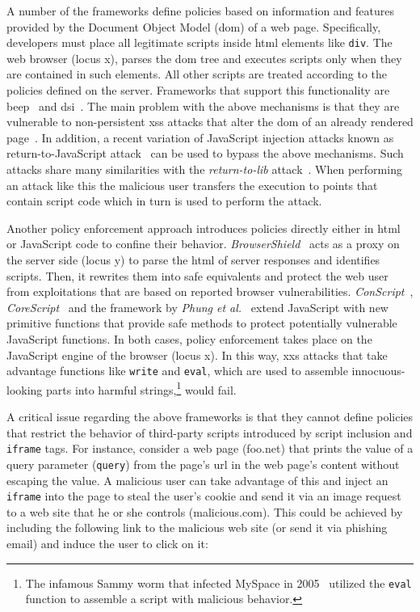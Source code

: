 \documentclass[conference]{IEEEtran}
\begin{document}
A number of the frameworks define policies
based on information and features provided by
the Document Object Model ({\sc dom}) of a web page.
Specifically, developers must place all legitimate
scripts inside {\sc html} elements like {\tt div}.
The web browser (locus {\sc x}), parses the
{\sc dom} tree and executes scripts only when they
are contained in such elements. All other scripts
are treated according to the policies defined
on the server. Frameworks that support this
functionality are {\sc beep}~\cite{TNH07}
and {\sc dsi}~\cite{NSS06}. The main problem with
the above mechanisms is that they are vulnerable
to non-persistent {\sc xss} attacks that alter
the {\sc dom} of an already rendered
page~\cite{APKLM10}.
In addition, a recent variation of JavaScript
injection attacks known as return-to-JavaScript
attack~\cite{APKLM10} can be used to bypass
the above mechanisms. Such attacks share
many similarities with the {\it return-to-lib}
attack~\cite{SPPGMMB04}. When performing an
attack like this the malicious user transfers the
execution to points that contain script
code which in turn is used to perform the attack.

Another policy enforcement approach introduces
policies directly either in {\sc html} or JavaScript code
to confine their behavior. {\it BrowserShield}~\cite{RDWDE07}
acts as a proxy on the server side (locus {\sc y}) to
parse the {\sc html} of server responses and identifies
scripts. Then, it rewrites them into safe equivalents
and protect the web user from exploitations
that are based on reported browser vulnerabilities.
{\it ConScript}~\cite{ML10}, {\it CoreScript}~\cite{YCIS07}
and the framework by {\it Phung et al.}~\cite{PSC09}
extend JavaScript with new primitive functions that
provide safe methods to protect potentially vulnerable
JavaScript functions. In both cases, policy enforcement takes
place on the JavaScript engine of the browser (locus {\sc x}).
In this way, {\sc xxs} attacks that take advantage
functions like {\tt write} and {\tt eval}, which are
used to assemble innocuous-looking parts into harmful
strings,\footnote{The infamous Sammy worm that
infected MySpace in 2005~\cite{SP07,ELX07}
utilized the {\tt eval} function to assemble a
script with malicious behavior.} would fail.

A critical issue regarding
the above frameworks is that they cannot
define policies that restrict the behavior of third-party
scripts introduced by script inclusion and {\tt iframe}
tags. For instance, consider a web page (foo.net)
that prints the value of a query parameter ({\tt query})
from the page's {\sc url} in the web page's content
without escaping the value. A malicious user
can take advantage of this and inject an {\tt iframe}
into the page to steal the user's cookie and
send it via an image request to a web site
that he or she controls (malicious.com).
This could be achieved by including the following
link to the malicious web site (or send it via phishing
email) and induce the user to click on it:
\end{document}
